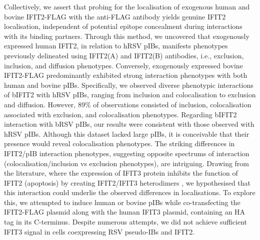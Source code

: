 Collectively, we assert that probing for the localisation of exogenous human and bovine IFIT2-FLAG with the anti-FLAG antibody yields genuine IFIT2 localisation, independent of potential epitope concealment during interactions with its binding partners. Through this method, we uncovered that exogenously expressed human IFIT2, in relation to hRSV pIBs, manifests phenotypes previously delineated using IFIT2(A) and IFIT2(B) antibodies, i.e., exclusion, inclusion, and diffusion phenotypes. Conversely, exogenously expressed bovine IFIT2-FLAG predominantly exhibited strong interaction phenotypes with both human and bovine pIBs. Specifically, we observed diverse phenotypic interactions of bIFIT2 with hRSV pIBs, ranging from inclusion and colocalisation to exclusion and diffusion. However, 89\% of observations consisted of inclusion, colocalisation associated with exclusion, and colocalisation phenotypes. Regarding bIFIT2 interaction with bRSV pIBs, our results were consistent with those observed with hRSV pIBs. Although this dataset lacked large pIBs, it is conceivable that their presence would reveal colocalisation phenotypes. The striking differences in IFIT2/pIB interaction phenotypes, suggesting opposite spectrums of interaction (colocalisation/inclusion vs exclusion phenotypes), are intriguing. Drawing from the literature, where the expression of IFIT3 protein inhibits the function of IFIT2 (apoptosis) by creating IFIT2/IFIT3 heterodimers \cite{Mears2018BetterResponse, Stawowczyk2011TheApoptosis}, we hypothesised that this interaction could underlie the observed differences in localisations. To explore this, we attempted to induce human or bovine pIBs while co-transfecting the IFIT2-FLAG plasmid along with the human IFIT3 plasmid, containing an HA tag in its C-terminus. Despite numerous attempts, we did not achieve sufficient IFIT3 signal in cells coexpressing RSV pseudo-IBs and IFIT2.

